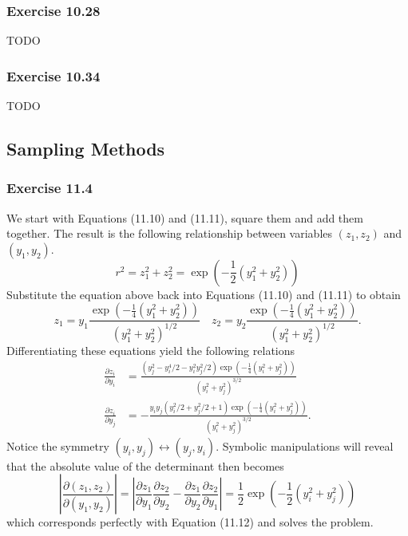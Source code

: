 \documentclass[12pt, a4paper]{article}
\newcommand{\abs}[1]{\left\lvert#1\right\rvert}
\begin{document}
\subsubsection*{Exercise 10.28}
TODO

\subsubsection*{Exercise 10.34}
TODO



\subsection{Sampling Methods}

\subsubsection*{Exercise 11.4}
We start with Equations (11.10) and (11.11), square them and add them together.
The result is the following relationship between variables $(z_1, z_2)$ and $(y_1, y_2)$.
\begin{equation*}
	r^2 = z_1^2 + z_2^2 = \exp \left( -\frac{1}{2} \left( y_1^2 + y_2^2 \right)  \right)
\end{equation*}
Substitute the equation above back into Equations (11.10) and (11.11) to obtain
\begin{equation*}
	z_1 = y_1 \frac{\exp \left( -\frac{1}{4} \left( y_1^2 + y_2^2 \right)  \right)}{\left(y_1^2 + y_2^2\right)^{1/2}}
	\quad
	z_2 = y_2 \frac{\exp \left( -\frac{1}{4} \left( y_1^2 + y_2^2 \right)  \right)}{\left(y_1^2 + y_2^2\right)^{1/2}}.
\end{equation*}
Differentiating these equations yield the following relations
\begin{align*}
\frac{\partial z_i}{\partial y_i}
&=
	\frac{\left(y_{j}^{2} - y_{i}^{4}/2 -  y_{i}^{2} y_{j}^{2}/2 \right) \exp \left( -\frac{1}{4} \left( y_i^2 + y_j^2 \right)  \right)}{\left(y_{i}^{2} + y_{j}^{2}\right)^{3/2}} \\
	\frac{\partial z_i}{\partial y_j}
	&=
	- \frac{y_{i} y_{j} \left(y_{i}^{2} /2 + y_{j}^{2} /2 + 1\right) \exp \left( -\frac{1}{4} \left( y_i^2 + y_j^2 \right)  \right)}{\left(y_{i}^{2} + y_{j}^{2}\right)^{3/2}}.
\end{align*}
Notice the symmetry $(y_i, y_j) \leftrightarrow (y_j, y_i)$.
Symbolic manipulations will reveal that the absolute value of the determinant then becomes
\begin{equation*}
	\abs{\frac{\partial (z_1, z_2)}{\partial (y_1, y_2)}}
	=
	\abs{ \frac{\partial z_1}{\partial y_1} \frac{\partial z_2}{\partial y_2}
		- \frac{\partial z_1}{\partial y_2} \frac{\partial z_2}{\partial y_1} }
	=
	\frac{1}{2} \exp \left( -\frac{1}{2} \left( y_i^2 + y_j^2 \right)  \right)
\end{equation*}
which corresponds perfectly with Equation (11.12) and solves the problem.
\end{document}
